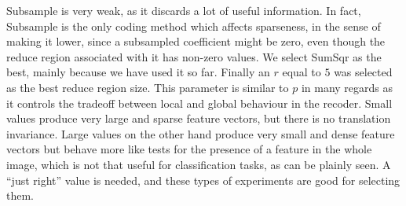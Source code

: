 \documentclass[12pt,a4paper,oneside,english]{UPBThesis}
\begin{document}
Subsample is very weak, as it discards a lot of useful information. In fact, Subsample is the only coding method which affects sparseness, in the sense of making it lower, since a subsampled coefficient might be zero, even though the reduce region associated with it has non-zero values. We select SumSqr as the best, mainly because we have used it so far. Finally an $r$ equal to $5$ was selected as the best reduce region size. This parameter is similar to $p$ in many regards as it controls the tradeoff between local and global behaviour in the recoder. Small values produce very large and sparse feature vectors, but there is no translation invariance. Large values on the other hand produce very small and dense feature vectors but behave more like tests for the presence of a feature in the whole image, which is not that useful for classification tasks, as can be plainly seen. A ``just right'' value is needed, and these types of experiments are good for selecting them.
\end{document}
